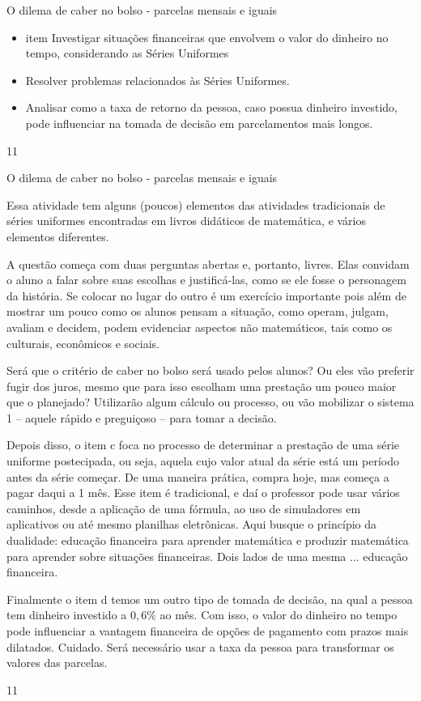 \begin{objectives}{O dilema de caber no bolso - parcelas mensais e iguais}
{
\begin{itemize}
\item item Investigar situações financeiras que envolvem o valor do dinheiro no tempo, considerando as Séries Uniformes
\item Resolver problemas relacionados às Séries Uniformes.
\item Analisar como a taxa de retorno da pessoa, caso possua dinheiro investido, pode influenciar na tomada de decisão em parcelamentos mais longos.
\end{itemize}
}{1}{1}
\end{objectives}
\marginpar{\vspace{-2.5em}}
\begin{sugestions}{O dilema de caber no bolso - parcelas mensais e iguais}
{
Essa atividade tem alguns (poucos) elementos das atividades tradicionais de séries uniformes encontradas em livros didáticos de matemática, e vários elementos diferentes. 

A questão começa com duas perguntas abertas e, portanto, livres. Elas convidam o aluno a falar sobre suas escolhas e justificá-las, como se ele fosse o personagem da história. Se colocar no lugar do outro é um exercício importante pois além de mostrar um pouco como os alunos pensam a situação, como operam, julgam, avaliam e decidem, podem evidenciar aspectos não matemáticos, tais como os culturais, econômicos e sociais.

Será que o critério de caber no bolso será usado pelos alunos? Ou eles vão preferir fugir dos juros, mesmo que para isso escolham uma prestação um pouco maior que o planejado? Utilizarão algum cálculo ou processo, ou vão mobilizar o sistema 1 – aquele rápido e preguiçoso – para tomar a decisão.

Depois disso, o item c foca no processo de determinar a prestação de uma série uniforme postecipada, ou seja, aquela cujo valor atual da série está um período antes da série começar. De uma maneira prática, compra hoje, mas começa a pagar daqui a 1 mês. Esse item é tradicional, e daí o professor pode usar vários caminhos, desde a aplicação de uma fórmula, ao uso de simuladores em aplicativos ou até mesmo planilhas eletrônicas. Aqui busque o princípio da dualidade: educação financeira para aprender matemática e produzir matemática para aprender sobre situações financeiras. Dois lados de uma mesma ... educação financeira. 

Finalmente o item d temos um outro tipo de tomada de decisão, na qual a pessoa tem dinheiro investido a $0{,}6\%$ ao mês. Com isso, o valor do dinheiro no tempo pode influenciar a vantagem financeira de opções de pagamento com prazos mais dilatados. Cuidado. Será necessário usar a taxa da pessoa para transformar os valores das parcelas. 

}{1}{1}
\end{sugestions}

